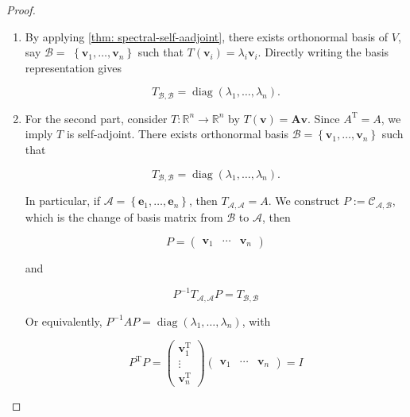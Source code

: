 \begin{proof}
\begin{enumerate}
    \item By applying \autoref{thm: spectral-self-aadjoint}, there exists orthonormal basis of \(V\), say \(\mathcal{B} =\)  \(\left\{  {{\mathbf{v}}_{1},\ldots,{\mathbf{v}}_{n}}\right\}\) such that \(T\left( {\mathbf{v}}_{i}\right)  = {\lambda }_{i}{\mathbf{v}}_{i}\). Directly writing the basis representation gives

    \[
    T_{\mathcal{B},\mathcal{B}} = \operatorname{diag}\left( {{\lambda }_{1},\ldots,{\lambda }_{n}}\right).
    \]
    
    \item For the second part, consider \(T : {\mathbb{R}}^{n} \rightarrow  {\mathbb{R}}^{n}\) by \(T\left( \mathbf{v}\right)  = \mathbf{{Av}}\). Since \({A}^{\mathrm{T}} = A\), we imply \(T\) is self-adjoint. There exists orthonormal basis \(\mathcal{B} = \left\{  {{\mathbf{v}}_{1},\ldots,{\mathbf{v}}_{n}}\right\}\) such that

    \[
    T_{\mathcal{B},\mathcal{B}} = \operatorname{diag}\left( {{\lambda }_{1},\ldots,{\lambda }_{n}}\right).
    \]
    
    In particular, if \(\mathcal{A} = \left\{  {{\mathbf{e}}_{1},\ldots,{\mathbf{e}}_{n}}\right\}\), then \(T_{\mathcal{A},\mathcal{A}} = A\). We construct \(P \mathrel{\text{ := }} {\mathcal{C}}_{\mathcal{A},\mathcal{B}}\), which is the change of basis matrix from \(\mathcal{B}\) to \(\mathcal{A}\), then
    
    \[
    P = \left( \begin{array}{lll} {\mathbf{v}}_{1} & \cdots & {\mathbf{v}}_{n} \end{array}\right)
    \]
    
    and
    
    \[
    {P}^{-1}T_{\mathcal{A},\mathcal{A}}P = T_{\mathcal{B},\mathcal{B}}
    \]
    
    Or equivalently, \({P}^{-1}{AP} = \operatorname{diag}\left( {{\lambda }_{1},\ldots,{\lambda }_{n}}\right)\), with
    
    \[
    {P}^{\mathrm{T}}P = \left( \begin{matrix} {\mathbf{v}}_{1}^{\mathrm{T}} \\  \vdots \\  {\mathbf{v}}_{n}^{\mathrm{T}} \end{matrix}\right) \left( \begin{array}{lll} {\mathbf{v}}_{1} & \cdots & {\mathbf{v}}_{n} \end{array}\right)  = I
    \]
\end{enumerate}
\end{proof}

